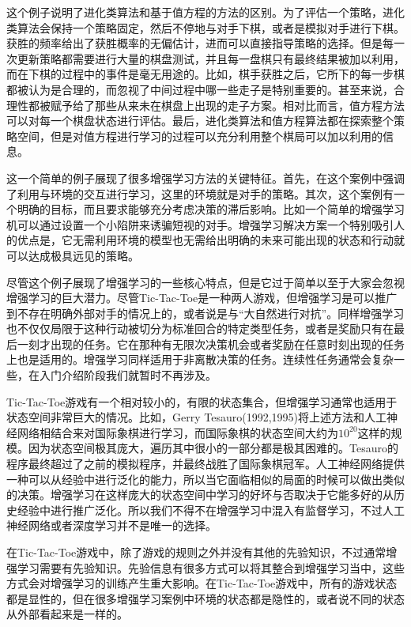\documentclass{ctexart}
\begin{document}
            这个例子说明了进化类算法和基于值方程的方法的区别。为了评估一个策略，进化类算法会保持一个策略固定，然后不停地与对手下棋，或者是模拟对手进行下棋。获胜的频率给出了获胜概率的无偏估计，进而可以直接指导策略的选择。但是每一次更新策略都需要进行大量的棋盘测试，并且每一盘棋只有最终结果被加以利用，而在下棋的过程中的事件是毫无用途的。比如，棋手获胜之后，它所下的每一步棋都被认为是合理的，而忽视了中间过程中哪一些走子是特别重要的。甚至来说，合理性都被赋予给了那些从来未在棋盘上出现的走子方案。相对比而言，值方程方法可以对每一个棋盘状态进行评估。最后，进化类算法和值方程算法都在探索整个策略空间，但是对值方程进行学习的过程可以充分利用整个棋局可以加以利用的信息。

            这一个简单的例子展现了很多增强学习方法的关键特征。首先，在这个案例中强调了利用与环境的交互进行学习，这里的环境就是对手的策略。其次，这个案例有一个明确的目标，而且要求能够充分考虑决策的滞后影响。比如一个简单的增强学习机可以通过设置一个小陷阱来诱骗短视的对手。增强学习解决方案一个特别吸引人的优点是，它无需利用环境的模型也无需给出明确的未来可能出现的状态和行动就可以达成极具远见的策略。

            尽管这个例子展现了增强学习的一些核心特点，但是它过于简单以至于大家会忽视增强学习的巨大潜力。尽管Tic-Tac-Toe是一种两人游戏，但增强学习是可以推广到不存在明确外部对手的情况上的，或者说是与“大自然进行对抗”。同样增强学习也不仅仅局限于这种行动被切分为标准回合的特定类型任务，或者是奖励只有在最后一刻才出现的任务。它在那种有无限次决策机会或者奖励在任意时刻出现的任务上也是适用的。增强学习同样适用于非离散决策的任务。连续性任务通常会复杂一些，在入门介绍阶段我们就暂时不再涉及。

            Tic-Tac-Toe游戏有一个相对较小的，有限的状态集合，但增强学习通常也适用于状态空间非常巨大的情况。比如，Gerry Tesauro(1992,1995)将上述方法和人工神经网络相结合来对国际象棋进行学习，而国际象棋的状态空间大约为$10^{20}$这样的规模。因为状态空间极其庞大，遍历其中很小的一部分都是极其困难的。Tesauro的程序最终超过了之前的模拟程序，并最终战胜了国际象棋冠军。人工神经网络提供一种可以从经验中进行泛化的能力，所以当它面临相似的局面的时候可以做出类似的决策。增强学习在这样庞大的状态空间中学习的好坏与否取决于它能多好的从历史经验中进行推广泛化。所以我们不得不在增强学习中混入有监督学习，不过人工神经网络或者深度学习并不是唯一的选择。

            在Tic-Tac-Toe游戏中，除了游戏的规则之外并没有其他的先验知识，不过通常增强学习需要有先验知识。先验信息有很多方式可以将其整合到增强学习当中，这些方式会对增强学习的训练产生重大影响。在Tic-Tac-Toe游戏中，所有的游戏状态都是显性的，但在很多增强学习案例中环境的状态都是隐性的，或者说不同的状态从外部看起来是一样的。
\end{document}
